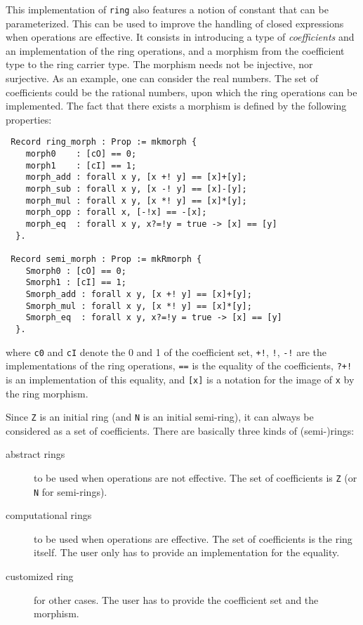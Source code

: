 This implementation of {\tt ring} also features a notion of constant
that can be parameterized. This can be used to improve the handling of
closed expressions when operations are effective. It consists in
introducing a type of \emph{coefficients} and an implementation of the
ring operations, and a morphism from the coefficient type to the ring
carrier type. The morphism needs not be injective, nor surjective.  As
an example, one can consider the real numbers. The set of coefficients
could be the rational numbers, upon which the ring operations can be
implemented. The fact that there exists a morphism is defined by the
following properties:
\begin{verbatim}
 Record ring_morph : Prop := mkmorph {
    morph0    : [cO] == 0;
    morph1    : [cI] == 1;
    morph_add : forall x y, [x +! y] == [x]+[y];
    morph_sub : forall x y, [x -! y] == [x]-[y];
    morph_mul : forall x y, [x *! y] == [x]*[y];
    morph_opp : forall x, [-!x] == -[x];
    morph_eq  : forall x y, x?=!y = true -> [x] == [y] 
  }.

 Record semi_morph : Prop := mkRmorph {
    Smorph0 : [cO] == 0;
    Smorph1 : [cI] == 1;
    Smorph_add : forall x y, [x +! y] == [x]+[y];
    Smorph_mul : forall x y, [x *! y] == [x]*[y];
    Smorph_eq  : forall x y, x?=!y = true -> [x] == [y] 
  }.
\end{verbatim}
where {\tt c0} and {\tt cI} denote the 0 and 1 of the coefficient set,
{\tt +!}, {\tt *!}, {\tt -!} are the implementations of the ring
operations, {\tt ==} is the equality of the coefficients, {\tt ?+!} is
an implementation of this equality, and {\tt [x]} is a notation for
the image of {\tt x} by the ring morphism.

Since {\tt Z} is an initial ring (and {\tt N} is an initial
semi-ring), it can always be considered as a set of
coefficients. There are basically three kinds of (semi-)rings:
\begin{description}
\item[abstract rings] to be used when operations are not
  effective. The set of coefficients is {\tt Z} (or {\tt N} for
  semi-rings).
\item[computational rings] to be used when operations are
  effective. The set of coefficients is the ring itself. The user only
  has to provide an implementation for the equality.
\item[customized ring] for other cases. The user has to provide the
  coefficient set and the morphism.
\end{description}

